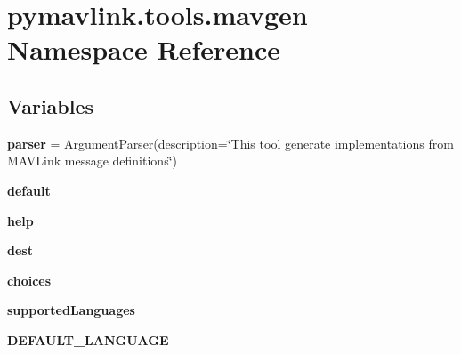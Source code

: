 \hypertarget{namespacepymavlink_1_1tools_1_1mavgen}{}\section{pymavlink.\+tools.\+mavgen Namespace Reference}
\label{namespacepymavlink_1_1tools_1_1mavgen}
\subsection*{Variables}
\begin{DoxyCompactItemize}
\item 
\mbox{\label{namespacepymavlink_1_1tools_1_1mavgen_a75961cc4774b7274c1b2beb747c502b5}} 
{\bfseries parser} = Argument\+Parser(description=\char`\"{}This tool generate implementations from M\+A\+V\+Link message definitions\char`\"{})
\item 
\mbox{\label{namespacepymavlink_1_1tools_1_1mavgen_ad13d167b072a2ad2faad668003687a68}} 
{\bfseries default}
\item 
\mbox{\label{namespacepymavlink_1_1tools_1_1mavgen_ab477f632a1433496e463a44bd4ec02bb}} 
{\bfseries help}
\item 
\mbox{\label{namespacepymavlink_1_1tools_1_1mavgen_a8b7a98f1656584e9893cfc3ba18e6d65}} 
{\bfseries dest}
\item 
\mbox{\label{namespacepymavlink_1_1tools_1_1mavgen_a4b803f2f45afaf55c54a2a6ce4d207e4}} 
{\bfseries choices}
\item 
\mbox{\label{namespacepymavlink_1_1tools_1_1mavgen_a59e9627cc807847e3c72205eecc64d22}} 
{\bfseries supported\+Languages}
\item 
\mbox{\label{namespacepymavlink_1_1tools_1_1mavgen_aedc782c7b233b48a826b4c172e13d6cc}} 
{\bfseries D\+E\+F\+A\+U\+L\+T\+\_\+\+L\+A\+N\+G\+U\+A\+GE}
\item 
\mbox{\label{namespacepymavlink_1_1tools_1_1mavgen_a9f4a817c91ec87a398a22689d2325070}} 

\end{DoxyCompactItemize}
